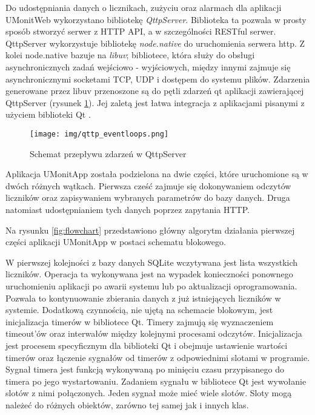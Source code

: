Do udostępniania danych o licznikach, zużyciu oraz alarmach dla aplikacji UMonitWeb wykorzystano bibliotekę \textit{QttpServer}.
Biblioteka ta pozwala w prosty sposób stworzyć serwer z HTTP API, a w szczególności RESTful serwer.
QttpServer wykorzystuje  bibliotekę \textit{node.native} do uruchomienia serwera http.
Z kolei node.native bazuje na \textit{libuv}; bibliotece, która służy do obsługi asynchronicznych zadań wejściowo - wyjściowych, między innymi zajmuje się asynchronicznymi socketami TCP, UDP i dostępem do systemu plików.
Zdarzenia generowane przez libuv przenoszone są do pętli zdarzeń qt aplikacji zawierającej QttpServer (rysunek \ref{fig:qttpserver_eventloop}).
Jej zaletą jest łatwa integracja z aplikacjami pisanymi z użyciem biblioteki Qt \cite{qttpserver}.

\begin{figure}[ht]
	\centering
	\texttt{[image: img/qttp\_eventloops.png]}
	\caption[Schemat przepływu zdarzeń w QttpServer]{Schemat przepływu zdarzeń w QttpServer \protect\cite{qttpserver}}
	\label{fig:qttpserver_eventloop}
\end{figure}

Aplikacja UMonitApp została podzielona na dwie części, które uruchomione są w dwóch różnych wątkach.
Pierwsza cześć zajmuje się dokonywaniem odczytów liczników oraz zapisywaniem wybranych parametrów do bazy danych.
Druga natomiast udostępnianiem tych danych poprzez zapytania HTTP.

Na rysunku \ref{fig:flowchart} przedstawiono główny algorytm działania pierwszej części aplikacji UMonitApp w postaci schematu blokowego.

W pierwszej kolejności z bazy danych SQLite wczytywana jest lista wszystkich liczników.
Operacja ta wykonywana jest na wypadek konieczności ponownego uruchomieniu aplikacji po awarii systemu lub po aktualizacji oprogramowania.
Pozwala to kontynuowanie zbierania danych z już istniejących liczników w systemie.
Dodatkową czynnością, nie ujętą na schemacie blokowym, jest inicjalizacja timerów w bibliotece Qt.
Timery zajmują się wyznaczeniem timeout'ów oraz interwałów między kolejnymi procesami odczytów.
Inicjalizacja jest procesem specyficznym dla biblioteki Qt i obejmuje ustawienie wartości timerów oraz łączenie sygnałów od timerów z odpowiednimi slotami w programie.
Sygnał timera jest funkcją wykonywaną po minięciu czasu przypisanego do timera po jego wystartowaniu.
Zadaniem sygnału w bibliotece Qt jest wywołanie slotów z nimi połączonych.
Jeden sygnał może mieć wiele slotów.
Sloty mogą należeć do różnych obiektów, zarówno tej samej jak i innych klas.

